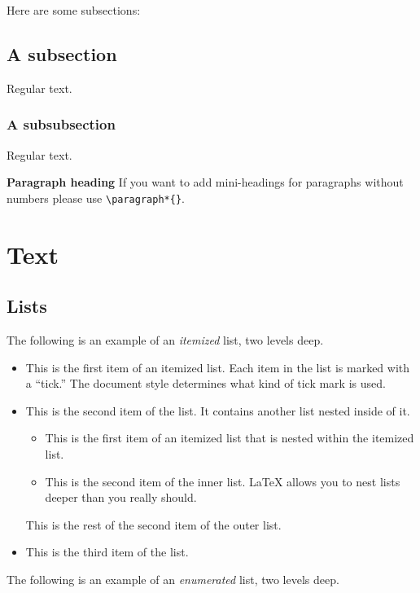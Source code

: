 \documentclass[qe,nameyear,final,supplement,openaccess]{econsocart}
\theoremstyle{plain}
\begin{document}
Here are some subsections:

\subsection{A subsection}

Regular text.

\subsubsection{A subsubsection}

Regular text.

\textbf{Paragraph heading}
If you want to add mini-headings for paragraphs without numbers please use \texttt{{\textbackslash}paragraph*\{\}}.

\section{Text}

\subsection{Lists}

The following is an example of an \textit{itemized} list,
two levels deep.

\begin{itemize}
\item This is the first item of an itemized list. Each item in the list is marked with a ``tick.'' The document style determines what kind of tick mark is used.
\item This is the second item of the list. It contains another list nested inside of it.

\begin{itemize}
\item This is the first item of an itemized list that is nested within the itemized list.
\item This is the second item of the inner list. LaTeX allows you to nest lists deeper than you really should.
\end{itemize}

This is the rest of the second item of the outer list.


\item This is the third item of the list.
\end{itemize}

The following is an example of an \textit{enumerated} list, two levels deep.
\end{document}
